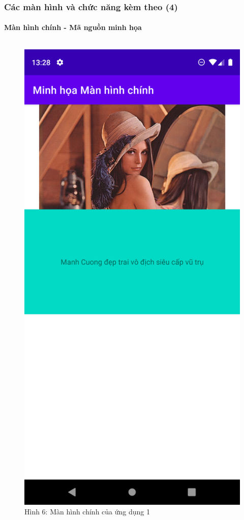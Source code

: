 \documentclass{beamer}
\begin{document}
\begin{frame}
    \frametitle{Các màn hình và chức năng kèm theo (4)}
    \framesubtitle{Màn hình chính - Mã nguồn minh họa}

    \begin{columns}
        \begin{figure}
            \centering
            \includegraphics[height=0.7\textheight]{images/10.png}
            \caption{\centering\tiny{Hình 6: Màn hình chính của ứng dụng 1}}


\end{figure}
\end{columns}
\end{frame}
\end{document}
